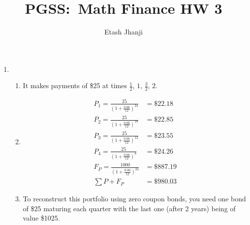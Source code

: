 \documentclass[12pt,letterpaper]{article}
\author{Etash Jhanji}
\title{PGSS:\ Math Finance HW 3}
\date{}
\begin{document}
\maketitle
\begin{enumerate}
    \item \begin{enumerate}
        \item It makes payments of \$25 at times $\frac{1}{2}$, $1$, $\frac{3}{2}$, $2$. 
        \item \begin{align*}
            P_1 = \frac{25}{(1+\frac{0.06}{12})^{24}} &= \$22.18\\
            P_2 = \frac{25}{(1+\frac{0.06}{12})^{18}} &= \$22.85\\
            P_3 = \frac{25}{(1+\frac{0.06}{12})^{12}} &= \$23.55\\
            P_4 = \frac{25}{(1+\frac{0.06}{12})^{6}} &= \$24.26\\
            F_P = \frac{1000}{(1+\frac{0.06}{12})^{24}} &= \$887.19\\
            \sum{P} + F_P &= \$980.03
        \end{align*}
        \item To reconstruct this portfolio using zero coupon bonds, you need one bond of \$25 maturing each quarter with the last one (after 2 years) being of value \$1025. 
    \end{enumerate}
\end{enumerate}
\end{document}
